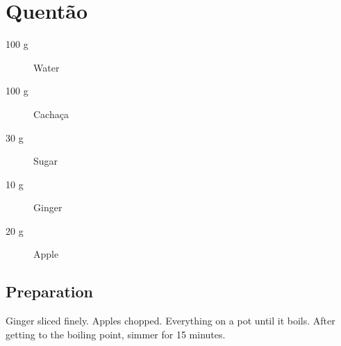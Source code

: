 \setchapterpreamble[u]{\margintoc}
\chapter{Quentão}

\begin{multicols}{2}
	\begin{description}
		\item[100 g] Water
		\item[100 g] Cachaça
		\item[30 g] Sugar
		\item[10 g] Ginger
		\item[20 g] Apple		
	\end{description}
\end{multicols}

\section{Preparation}

Ginger sliced finely. Apples chopped. Everything on a pot until it boils. After getting to the boiling point, simmer for 15 minutes.


